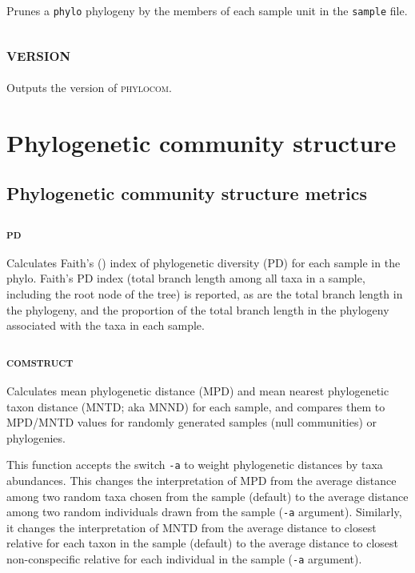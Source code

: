 \documentclass[12pt,letterpaper]{article}
\newcommand{\phylocomversion}{4.2}
\begin{document}
Prunes a \verb|phylo| phylogeny by the members of each sample unit in
the \verb|sample| file.


\subsection{\scshape version}

Outputs the version of {\scshape phylocom}. %

\section{Phylogenetic community structure}

\subsection{Phylogenetic community structure metrics}

\subsubsection{\scshape pd}

Calculates Faith's (\citeyear{faith1992con}) index of phylogenetic
diversity (PD) for each sample in the phylo. Faith's PD index (total branch length
among all taxa in a sample, including the root node of the tree) is reported,
as are the total branch length in the phylogeny, and the proportion of the total
branch length in the phylogeny associated with the taxa in each sample.  

\subsubsection{\scshape comstruct}

Calculates mean phylogenetic distance (MPD) and mean nearest
phylogenetic taxon distance (MNTD; aka MNND) for each sample, and
compares them to MPD/MNTD values for randomly generated samples (null
communities) or phylogenies.

This function accepts the switch \verb|-a| to weight phylogenetic distances by taxa abundances. This changes the interpretation of MPD from the average distance among two random taxa chosen from the sample (default) to the average distance among two random individuals drawn from the sample (\verb|-a| argument). Similarly, it changes the interpretation of MNTD from the average distance to closest relative for each taxon in the sample (default) to the average distance to closest non-conspecific relative for each individual in the sample (\verb|-a| argument).
\end{document}
